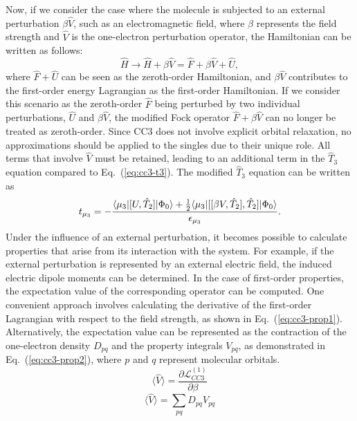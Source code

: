 Now, if we consider the case where the molecule is subjected to an external perturbation $\beta\hat{V}$, such as an electromagnetic field, where $\beta$ represents the field strength and $\hat{V}$ is the one-electron perturbation operator, the Hamiltonian can be written as follows:
\begin{equation}
\hat{H}  \rightarrow \hat{H} + \beta\hat{V} = \hat{F} + \beta\hat{V} + \hat{U},
\label{eq:cc3-h-pert}
\end{equation}
where $\hat{F}+\hat{U}$ can be seen as the zeroth-order Hamiltonian, and $\beta\hat{V}$ contributes to the first-order energy Lagrangian as the first-order Hamiltonian. If we consider this scenario as the zeroth-order $\hat{F}$ being perturbed by two individual perturbations, $\hat{U}$ and $\beta\hat{V}$, the modified Fock operator $\hat{F}+\beta\hat{V}$ can no longer be treated as zeroth-order. Since CC3 does not involve explicit orbital relaxation, no approximations should be applied to the singles due to their unique role. All terms that involve $\hat{V}$ must be retained, leading to an additional term in the $\hat{T}_{3}$ equation compared to Eq.~(\ref{eq:cc3-t3}). The modified $\hat{T}_{3}$ equation can be written as 
\begin{equation}
t_{\mu_{3}}= -\frac{\langle\mu_{3} |[U, \hat{T}_{2}]| \Phi_{0} \rangle + \frac{1}{2}\langle\mu_{3} |[[\beta V, \hat{T}_{2}], \hat{T}_{2}]| \Phi_{0} \rangle}{\epsilon_{\mu_{3}}}.
\label{eq:cc3-final-t3-pert}
\end{equation}
Under the influence of an external perturbation, it becomes possible to calculate properties that arise from its interaction with the system. For example, if the external perturbation is represented by an external electric field, the induced electric dipole moments can be determined. In the case of first-order properties, the expectation value of the corresponding operator can be computed. One convenient approach involves calculating the derivative of the first-order Lagrangian with respect to the field strength, as shown in Eq.~(\ref{eq:cc3-prop1}). Alternatively, the expectation value can be represented as the contraction of the one-electron density $D_{pq}$ and the property integrals $V_{pq}$, as demonstrated in Eq.~(\ref{eq:cc3-prop2}), where $p$ and $q$ represent molecular orbitals. 
\begin{equation}
\langle\hat{V}\rangle = \frac{\partial\mathcal{L}_{CC3}^{(1)}}{\partial\beta}
\label{eq:cc3-prop1}
\end{equation}
\begin{equation}
\langle\hat{V}\rangle = \sum_{pq}D_{pq}V_{pq}
\label{eq:cc3-prop2}
\end{equation}
